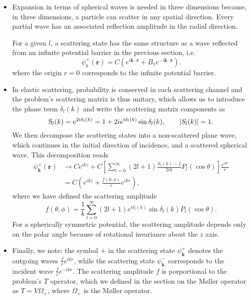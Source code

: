 \documentclass[11pt, a4paper]{article}
\newcommand{\Mol}{M\o ller\xspace}
\renewcommand{\vec}[1]{\bm{#1}}  %
\renewcommand{\r}{\vec{r}}  %
\begin{document}
\begin{itemize}
    \item Expansion in terms of spherical waves is needed in three dimensions because, in three dimensions, a particle can scatter in any spatial direction. Every partial wave has an associated reflection amplitude in the radial direction. 

    For a given $ l $, a scattering state has the same structure as a wave reflected from an infinite potential barrier in the previous section, i.e. 
    \begin{equation*}
        \psi_{k}^{+}(\r) = C \left( e^{i \vec{k} \cdot \r} + B_{1} e^{- i \vec{k} \cdot \r} \right).
    \end{equation*}
    where the origin $ r = 0 $ corresponds to the infinite potential barrier. 
    
    \item In elastic scattering, probability is conserved in each scattering channel and the problem's scattering matrix is thus unitary, which allows us to introduce the phase term $ \delta_{l}(k) $ and write the scattering matrix components as
    \begin{equation*}
        \mathrm{S}_{l}(k) = e^{2i \delta_{l}(k)} = 1 + 2i e^{i \delta_{l}(k)} \sin \delta_{l}(k), \qquad \abs{S_{l}(k)} = 1.
    \end{equation*}
    We then decompose the scattering states into a non-scattered plane wave, which continues in the initial direction of incidence, and a scattered spherical wave. This decomposition reads
    \begin{align*}
        \psi_{\vec{k}}^{+}(\r) &\to C e^{ikz} + C \left[ \sum_{l = 0}^{\infty} (2l + 1) \frac{S_{l}(k) - 1}{2ik} P_{l}(\cos \theta) \right]\frac{e^{ikr}}{r}\\
        & = C \left( e^{ikz} + \frac{f(\theta, \phi)}{r} e^{ikr} \right),
    \end{align*}
    where we have defined the scattering amplitude
    \begin{equation*}
        f(\theta, \phi) = \frac{1}{k} \sum_{l = 0}^{\infty} (2l + 1)e^{i\delta_{l}(k)} \sin \delta_{l}(k) P_{l}(\cos \theta).
    \end{equation*}
    For a spherically symmetric potential, the scattering amplitude depends only on the polar angle because of rotational invariance about the $ z $ axis. 

    \item Finally, we note: the symbol $ + $ in the scattering state $ \psi_{\vec{k}}^{+} $ denotes the outgoing waves $ \frac{f}{r}e^{ikr} $, while the scattering state $ \psi_{\vec{k}}^{-} $ corresponds to the incident wave $ \frac{f}{r}e^{-ikr} $. The scattering amplitude $ f $ is porportional to the problem's $ T $ operator, which we defined in the section on the \Mol operator as $ T = V \Omega_{+} $, where $ \Omega_{+} $ is the \Mol operator.

\end{itemize}
\end{document}
